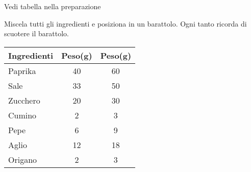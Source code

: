 \serves{-}
\cooktime[Cottura]{-}
\vegetarian
\begin{ingreds}
	Vedi tabella nella preparazione

\end{ingreds}

\begin{method}
Miscela tutti gli ingredienti e posiziona in un barattolo. Ogni tanto ricorda di scuotere il barattolo.
\begin{table}[h]
\begin{tabular}{lcc}
\toprule
	Ingredienti	&	Peso(g)	&	Peso(g)\\
\midrule
	Paprika		&	40	&	60	\\
	Sale		&	33	&	50	\\
	Zucchero	&	20	&	30	\\
	Cumino		&	2	&	3	\\
	Pepe		&	6	&	9	\\
	Aglio		&	12	&	18	\\
	Origano		&	2	&	3	\\
\bottomrule
\end{tabular}
\end{table}
\end{method}



